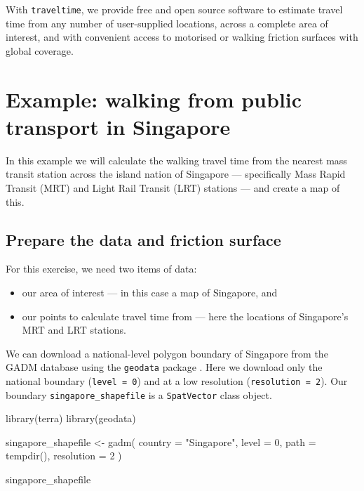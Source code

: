 \documentclass[
  10pt,
  letterpaper,
]{article}
\newenvironment{Shaded}{\begin{snugshade}}{\end{snugshade}}
\newcommand{\AttributeTok}[1]{\textcolor[rgb]{0.40,0.45,0.13}{#1}}
\newcommand{\DecValTok}[1]{\textcolor[rgb]{0.68,0.00,0.00}{#1}}
\newcommand{\FunctionTok}[1]{\textcolor[rgb]{0.28,0.35,0.67}{#1}}
\newcommand{\NormalTok}[1]{\textcolor[rgb]{0.00,0.23,0.31}{#1}}
\newcommand{\OtherTok}[1]{\textcolor[rgb]{0.00,0.23,0.31}{#1}}
\newcommand{\StringTok}[1]{\textcolor[rgb]{0.13,0.47,0.30}{#1}}
\providecommand{\tightlist}{%
  \setlength{\itemsep}{0pt}\setlength{\parskip}{0pt}}\usepackage{longtable,booktabs,array}
\begin{document}
With \texttt{traveltime}, we provide free and open source software to
estimate travel time from any number of user-supplied locations, across
a complete area of interest, and with convenient access to motorised or
walking friction surfaces with global coverage.

\section{Example: walking from public transport in
Singapore}\label{example-walking-from-public-transport-in-singapore}

In this example we will calculate the walking travel time from the
nearest mass transit station across the island nation of Singapore ---
specifically Mass Rapid Transit (MRT) and Light Rail Transit (LRT)
stations --- and create a map of this.

\subsection{Prepare the data and friction
surface}\label{prepare-the-data-and-friction-surface}

For this exercise, we need two items of data:

\begin{itemize}
\tightlist
\item
  our area of interest --- in this case a map of Singapore, and
\item
  our points to calculate travel time from --- here the locations of
  Singapore's MRT and LRT stations.
\end{itemize}

We can download a national-level polygon boundary of Singapore from the
GADM \citep{gadm} database using the \texttt{geodata} package
\citep{geodata}. Here we download only the national boundary
(\texttt{level\ =\ 0}) and at a low resolution
(\texttt{resolution\ =\ 2}). Our boundary \texttt{singapore\_shapefile}
is a \texttt{SpatVector} class object.

\begin{Shaded}
\begin{Highlighting}[]
\FunctionTok{library}\NormalTok{(terra)}
\FunctionTok{library}\NormalTok{(geodata)}

\NormalTok{singapore\_shapefile }\OtherTok{\textless{}{-}} \FunctionTok{gadm}\NormalTok{(}
  \AttributeTok{country =} \StringTok{"Singapore"}\NormalTok{,}
  \AttributeTok{level =} \DecValTok{0}\NormalTok{,}
  \AttributeTok{path =} \FunctionTok{tempdir}\NormalTok{(),}
  \AttributeTok{resolution =} \DecValTok{2}
\NormalTok{)}

\NormalTok{singapore\_shapefile}
\end{Highlighting}
\end{Shaded}
\end{document}
